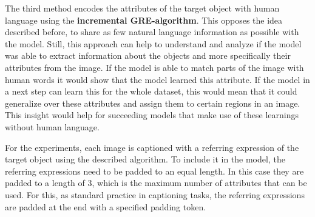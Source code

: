 The third method encodes the attributes of the target object with human language using the \textbf{incremental GRE-algorithm}.
This opposes the idea described before, to share as few natural language information as possible with the model.
Still, this approach can help to understand and analyze if the model was able to extract information about the objects and more specifically their attributes from the image.
If the model is able to match parts of the image with human words it would show that the model learned this attribute.
If the model in a next step can learn this for the whole dataset, this would mean that it could generalize over these attributes and assign them to certain regions in an image.
This insight would help for succeeding models that make use of these learnings without human language.


For the experiments, each image is captioned with a referring expression of the target object using the described algorithm.
To include it in the model, the referring expressions need to be padded to an equal length.
In this case they are padded to a length of 3, which is the maximum number of attributes that can be used.
For this, as standard practice in captioning tasks, the referring expressions are padded at the end with a specified padding token.

